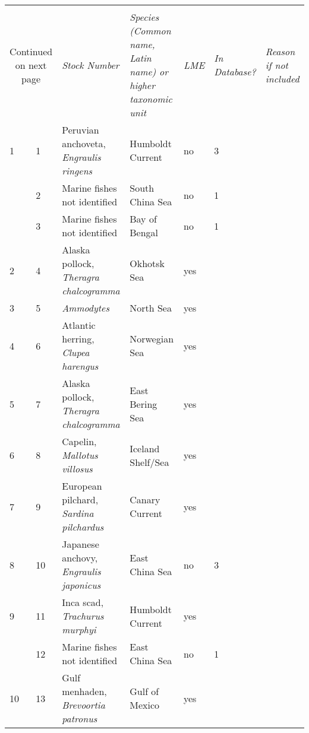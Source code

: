 
\begin{longtable}{p{2cm} | p{2cm} | p{5cm} | l | p{2cm} | p{2cm}}
  \bottomrule \\ \multicolumn{2}{c}{Continued on next page} \endfoot \endlastfoot
\textit{Stock Rank} & \textit{Stock Number} & \textit{Species (Common name, Latin name) or higher taxonomic unit} & \textit{LME} & \textit{In Database?} & \textit{Reason if not included} \\ \midrule \endhead
1 & 1& Peruvian anchoveta, \textit{Engraulis ringens} & Humboldt Current & no & 3\\
 & 2& Marine fishes not identified & South China Sea & no & 1\\
 & 3& Marine fishes not identified & Bay of Bengal & no & 1\\ \hline
2 & 4& Alaska pollock, \textit{Theragra chalcogramma} & Okhotsk Sea & yes & \\ \hline
3 & 5& \textit{Ammodytes} & North Sea & yes & \\ \hline
4 & 6& Atlantic herring, \textit{Clupea harengus} & Norwegian Sea & yes & \\ \hline
5 & 7& Alaska pollock, \textit{Theragra chalcogramma} & East Bering Sea & yes & \\ \hline
6 & 8& Capelin, \textit{Mallotus villosus} & Iceland Shelf/Sea & yes & \\ \hline
7 & 9& European pilchard, \textit{Sardina pilchardus} & Canary Current & yes & \\ \hline
8 & 10& Japanese anchovy, \textit{Engraulis japonicus} & East China Sea & no & 3\\ \hline
9 & 11& Inca scad, \textit{Trachurus murphyi} & Humboldt Current & yes & \\ \hline
 & 12& Marine fishes not identified & East China Sea & no & 1\\ \hline
10 & 13& Gulf menhaden, \textit{Brevoortia patronus} & Gulf of Mexico & yes & \\ 

\end{longtable}
